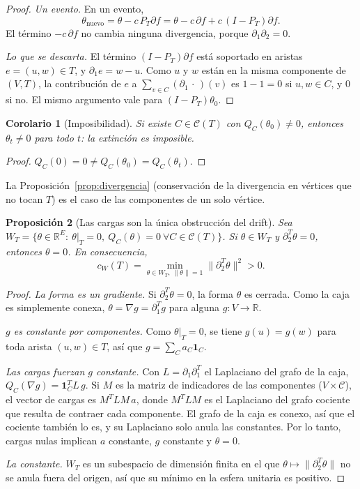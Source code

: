 \documentclass[11pt,a4paper]{article}
\theoremstyle{plain}
\newtheorem{proposicion}{Proposición}[section]
\newtheorem{corolario}[proposicion]{Corolario}
\theoremstyle{remark}
\newcommand{\R}{\mathbb{R}}
\newcommand{\norm}[1]{\lVert #1\rVert}
\begin{document}
\begin{proof}
\textit{Un evento.} En un evento,
\[
\theta_{\text{nuevo}}=\theta-c\,P_T\partial f=\theta-c\,\partial f+c\,(I-P_T)\partial f .
\]
El término $-c\,\partial f$ no cambia ninguna divergencia, porque $\partial_1\partial_2=0$.

\noindent\textit{Lo que se descarta.} El término $(I-P_T)\partial f$ está soportado en aristas $e=(u,w)\in T$, y $\partial_1e=w-u$. Como $u$ y $w$ están en la misma componente de $(V,T)$, la contribución de $e$ a $\sum_{v\in C}(\partial_1\,\cdot\,)(v)$ es $1-1=0$ si $u,w\in C$, y $0$ si no. El mismo argumento vale para $(I-P_T)\theta_0$.
\end{proof}

\begin{corolario}[Imposibilidad]\label{cor:imposible}
Si existe $C\in\mathcal C(T)$ con $Q_C(\theta_0)\neq0$, entonces $\theta_t\neq0$ para todo $t$: la extinción es imposible.
\end{corolario}

\begin{proof}
$Q_C(0)=0\ne Q_C(\theta_0)=Q_C(\theta_t)$.
\end{proof}

\noindent La Proposición~\ref{prop:divergencia} (conservación de la divergencia en vértices que no tocan $T$) es el caso de las componentes de un solo vértice.

\begin{proposicion}[Las cargas son la única obstrucción del drift]\label{prop:inyectivo}
Sea $W_T=\{\theta\in\R^{E}:\ \theta|_T=0,\ Q_C(\theta)=0\ \forall C\in\mathcal C(T)\}$. Si $\theta\in W_T$ y $\partial_2^T\theta=0$, entonces $\theta=0$. En consecuencia,
\[
c_W(T)=\min_{\theta\in W_T,\ \norm{\theta}=1}\norm{\partial_2^T\theta}^2>0 .
\]
\end{proposicion}

\begin{proof}
\textit{La forma es un gradiente.} Si $\partial_2^T\theta=0$, la forma $\theta$ es cerrada. Como la caja es simplemente conexa, $\theta=\nabla g=\partial_1^Tg$ para alguna $g:V\to\R$.

\noindent\textit{$g$ es constante por componentes.} Como $\theta|_T=0$, se tiene $g(u)=g(w)$ para toda arista $(u,w)\in T$, así que $g=\sum_{C}a_C\mathbf 1_C$.

\noindent\textit{Las cargas fuerzan $g$ constante.} Con $L=\partial_1\partial_1^T$ el Laplaciano del grafo de la caja, $Q_C(\nabla g)=\mathbf 1_C^TL\,g$. Si $M$ es la matriz de indicadores de las componentes ($V\times\mathcal C$), el vector de cargas es $M^TLM\,a$, donde $M^TLM$ es el Laplaciano del grafo cociente que resulta de contraer cada componente. El grafo de la caja es conexo, así que el cociente también lo es, y su Laplaciano solo anula las constantes. Por lo tanto, cargas nulas implican $a$ constante, $g$ constante y $\theta=0$.

\noindent\textit{La constante.} $W_T$ es un subespacio de dimensión finita en el que $\theta\mapsto\norm{\partial_2^T\theta}$ no se anula fuera del origen, así que su mínimo en la esfera unitaria es positivo.
\end{proof}
\end{document}
